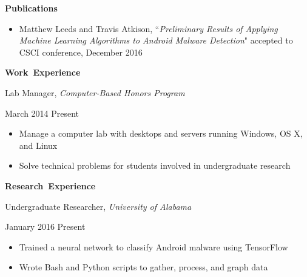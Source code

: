 \documentclass[11pt]{article}
\begin{document}
\vspace{0.8em}
\hbox{\large \textbf{Publications}}

\begin{itemize}[itemindent=0em]
  \item Matthew Leeds and Travis Atkison, ``\textit{Preliminary Results of Applying Machine Learning Algorithms to Android Malware Detection}" accepted to CSCI conference, December 2016
\end{itemize}

\vspace{0.8em}
\hbox{\large \textbf{Work Experience}}

\begin{minipage}[t]{0.65\textwidth}
\flushleft
Lab Manager, \textit{Computer-Based Honors Program}\\
\end{minipage}
\begin{minipage}[t]{0.30\textwidth}
\flushright
March 2014 \space \textemdash \space Present\\
\end{minipage}

\begin{itemize}
  \item Manage a computer lab with desktops and servers running Windows, OS X, and Linux
  \item Solve technical problems for students involved in undergraduate research
\end{itemize}

\vspace{0.8em}
\hbox{\large \textbf{Research Experience}}

\vspace{0.4em}
\begin{minipage}[t]{0.65\textwidth}
\flushleft
Undergraduate Researcher, \textit{University of Alabama}\\
\end{minipage}
\begin{minipage}[t]{0.30\textwidth}
\flushright
January 2016 \space \textemdash \space Present\\
\end{minipage}

\begin{itemize}
  \item Trained a neural network to classify Android malware using TensorFlow
  \item Wrote Bash and Python scripts to gather, process, and graph data
\end{itemize}
\end{document}
